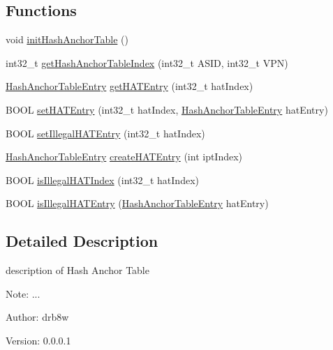 \subsection*{Functions}
\begin{CompactItemize}
\item 
void \hyperlink{group___v_m_m___h_a_t_ge31a05f91c4fb2cb19f80de59672a3fc}{initHashAnchorTable} ()
\item 
int32\_\-t \hyperlink{group___v_m_m___h_a_t_g25766528701c0fd3f34edbe61803e398}{getHashAnchorTableIndex} (int32\_\-t ASID, int32\_\-t VPN)
\item 
\hyperlink{group___v_m_m___h_a_t_g06b98a0b294446afee1b27a04682d7c2}{HashAnchorTableEntry} \hyperlink{group___v_m_m___h_a_t_g6d77bf5eb6d8b03e762b5b5c4f82a3d9}{getHATEntry} (int32\_\-t hatIndex)
\item 
BOOL \hyperlink{group___v_m_m___h_a_t_g04b252b48624d628fb9679afac037553}{setHATEntry} (int32\_\-t hatIndex, \hyperlink{group___v_m_m___h_a_t_g06b98a0b294446afee1b27a04682d7c2}{HashAnchorTableEntry} hatEntry)
\item 
BOOL \hyperlink{group___v_m_m___h_a_t_g65d55af720a6e86ea7018e5455047269}{setIllegalHATEntry} (int32\_\-t hatIndex)
\item 
\hyperlink{group___v_m_m___h_a_t_g06b98a0b294446afee1b27a04682d7c2}{HashAnchorTableEntry} \hyperlink{group___v_m_m___h_a_t_g675250e60a6a6b29b540d8a029db25bf}{createHATEntry} (int iptIndex)
\item 
BOOL \hyperlink{group___v_m_m___h_a_t_g310fed144216406f0affe436c1231342}{isIllegalHATIndex} (int32\_\-t hatIndex)
\item 
BOOL \hyperlink{group___v_m_m___h_a_t_g103d7fcf856a6ff6afb186439d1c308e}{isIllegalHATEntry} (\hyperlink{group___v_m_m___h_a_t_g06b98a0b294446afee1b27a04682d7c2}{HashAnchorTableEntry} hatEntry)
\end{CompactItemize}


\subsection{Detailed Description}
description of Hash Anchor Table 

\begin{Desc}
\item[Note:]... \end{Desc}
\begin{Desc}
\item[Author:]drb8w \end{Desc}
\begin{Desc}
\item[Version:]0.0.0.1 \end{Desc}


